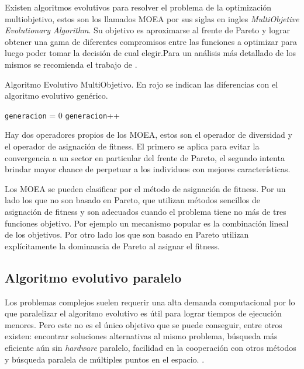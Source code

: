 Existen algoritmos evolutivos para resolver el problema de la optimización multiobjetivo, estos son los llamados MOEA por sus siglas en ingles \emph{ MultiObjetive Evolutionary Algorithm}. Su objetivo es aproximarse al frente de Pareto y lograr obtener una gama de diferentes compromisos entre las funciones a optimizar para luego poder tomar la decisión de cual elegir.Para un análisis más detallado de los mismos se recomienda el trabajo de \citet{Deb2001}.


\begin{algorithm}%
	\caption{Algoritmo Evolutivo MultiObjetivo. En rojo se indican las diferencias con el algoritmo evolutivo genérico.}
	\label{alg:algoritmo_genetico_multiobjetivo}
	\begin{algorithmic} [1] 
		{
			\STATE \texttt{generacion} = 0
			\STATE {\textcolor{red}{Operador Diversidad (Pob(generacion))}}
			\STATE {\textcolor{red}{Asignar Fitness (Pob(generacion))}}
			\STATE \texttt{generacion}++
			\ENDWHILE
			\RETURN 	{\textcolor{red}{Frente de Pareto}}
		}
	\end{algorithmic}
\end{algorithm}

Hay dos operadores propios de los MOEA, estos son el operador de diversidad y el operador de asignación de fitness. El primero se aplica para evitar la convergencia a un sector en particular del frente de Pareto, el segundo intenta brindar mayor chance de perpetuar a los individuos con mejores características.

Los MOEA se pueden clasificar por el método de asignación de fitness. Por un lado los que no son basado en Pareto, que utilizan métodos sencillos de asignación de fitness y son adecuados cuando el problema tiene no más de tres funciones objetivo. Por ejemplo un mecanismo popular es la combinación lineal de los objetivos. Por otro lado los que son basado en Pareto utilizan explícitamente la dominancia de Pareto al asignar el fitness.




\subsection{Algoritmo evolutivo paralelo}
Los problemas complejos suelen requerir una alta demanda computacional por lo que paralelizar el algoritmo evolutivo es útil para lograr tiempos de ejecución menores. Pero este no es el único objetivo que se puede conseguir, entre otros existen: encontrar soluciones alternativas al mismo problema, búsqueda más eficiente aún sin \emph{hardware} paralelo, facilidad en la cooperación con otros métodos y búsqueda paralela de múltiples puntos en el espacio. \citep{Alba2002}. 

